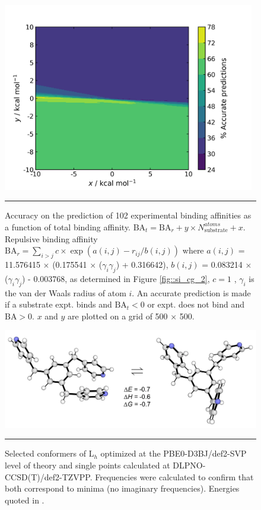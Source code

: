 \documentclass[../../main.tex]{subfiles}
\begin{document}
\begin{figure}[h!]
	\vspace{0.4cm}
	\centering
	\includegraphics[width=11cm]{3/cgbind/figs/figS4}
	\vspace{0.2cm}
	\hrule
	\caption{Accuracy on the prediction of 102 experimental binding affinities as a function of total binding affinity. $\text{BA}_t = \text{BA}_r + y \times N_\text{substrate}^{atoms} + x$. Repulsive binding affinity $\text{BA}_r = \sum_{i>j} c \times \exp(a(i, j) - r_{ij}/b(i, j))$ where $a(i, j)$ = 11.576415 $\times$ (0.175541 $\times$ ($\gamma_i \gamma_j$) + 0.316642), $b(i, j)$ = 0.083214 $\times$ ($\gamma_i \gamma_j$) - 0.003768, as determined in Figure \ref{fig::si_cg_2}, $c = 1$ \kcal, $\gamma_i$ is the van der Waals radius of atom $i$. An accurate prediction is made if a substrate expt. binds and $\text{BA}_{t} < 0$ or expt. does not bind and $\text{BA} > 0$. $x$ and $y$ are plotted on a grid of 500 × 500.}
	\label{fig::sicg_4}
\end{figure}


\begin{figure}[h!]
	\vspace{0.4cm}
	\centering
	\includegraphics[width=13cm]{3/cgbind/figs/figS5}
	\vspace{0.2cm}
	\hrule
	\caption{Selected conformers of L$_h$ optimized at the PBE0-D3BJ/def2-SVP level of theory and single points calculated at DLPNO-CCSD(T)/def2-TZVPP. Frequencies were calculated to confirm that both correspond to minima (no imaginary frequencies). Energies quoted in \kcal.}
	\label{fig::si_cg_5}
\end{figure}
\end{document}
